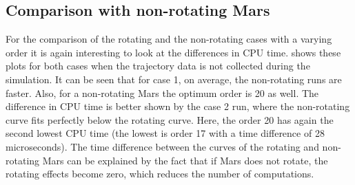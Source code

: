\subsection{Comparison with non-rotating Mars}
\label{subsec:orderCompNotRot}
For the comparison of the rotating and the non-rotating cases with a varying order it is again interesting to look at the differences in CPU time.  shows these plots for both cases when the trajectory data is not collected during the simulation. It can be seen that for case 1, on average, the non-rotating runs are faster. Also, for a non-rotating Mars the optimum order is 20 as well. The difference in CPU time is better shown by the case 2 run, where the non-rotating curve fits perfectly below the rotating curve. Here, the order 20 has again the second lowest CPU time (the lowest is order 17 with a time difference of 28 microseconds). The time difference between the curves of the rotating and non-rotating Mars can be explained by the fact that if Mars does not rotate, the rotating effects become zero, which reduces the number of computations.
%
%
%
%
%


